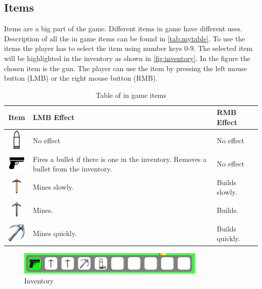 \subsection{Items}
Items are a big part of the game.
Different items in game have different uses. 
Description of all the in game items can be found in \autoref{tab:mytable}.
To use the items the player has to select the item using number keys 0-9.
The selected item will be highlighted in the inventory as shown in \autoref{fig:inventory}.
In the figure the chosen item is the gun.
The player can use the item by pressing the left mouse button (LMB) or the right mouse button (RMB).

\begin{table}[h]
    \centering
    \begin{tabular}{|c|p{5cm}|p{5cm}|}
    \hline
    Item & LMB Effect & RMB Effect \\
    \hline
    \includegraphics[width=1cm]{sections/user_manual/resources/bullet.png} & No effect & No effect \\
    \hline
    \includegraphics[width=1cm]{sections/user_manual/resources/pistol.png} & Fires a bullet if there is one in the inventory. Removes a bullet from the inventory. & No effect \\
    \hline
    \includegraphics[width=1cm]{sections/user_manual/resources/pickaxe-slow.png} & Mines slowly. & Builds slowly. \\
    \hline
    \includegraphics[width=1cm]{sections/user_manual/resources/pickaxe-mid.png} & Mines. & Builds. \\
    \hline
    \includegraphics[width=1cm]{sections/user_manual/resources/pickaxe-fast.png} & Mines quickly. & Builds quickly. \\
    \hline
    \end{tabular}
    \caption{Table of in game items}
    \label{tab:mytable}
\end{table}

\begin{figure}[H]
    \centering
    \includegraphics[width=0.8\textwidth]{sections/user_manual/resources/inventory.png}
    \caption{Inventory}
    \label{fig:inventory}
\end{figure}